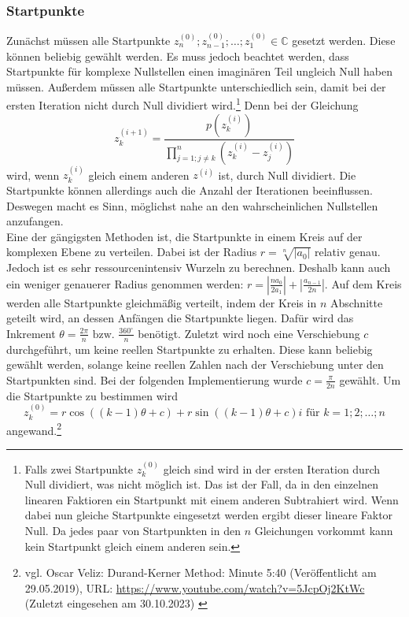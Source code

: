 \documentclass[12pt]{article}
\begin{document}
\subsubsection{Startpunkte}
Zunächst müssen alle Startpunkte $z_n^{(0)};z_{n-1}^{(0)};\dots;z_1^{(0)} \in \mathbb{C}$ gesetzt werden. Diese können beliebig gewählt werden. Es muss jedoch beachtet werden, dass Startpunkte für komplexe Nullstellen einen imaginären Teil ungleich Null haben müssen. Außerdem müssen alle Startpunkte unterschiedlich sein, damit bei der ersten Iteration nicht durch Null dividiert wird.\footnote{
    Falls zwei Startpunkte $z_k^{(0)}$ gleich sind wird in der ersten Iteration durch Null dividiert, was nicht möglich ist. Das ist der Fall, da in den einzelnen linearen Faktioren ein Startpunkt mit einem anderen Subtrahiert wird. Wenn dabei nun gleiche Startpunkte eingesetzt werden ergibt dieser lineare Faktor Null. Da jedes paar von Startpunkten in den $n$ Gleichungen vorkommt kann kein Startpunkt gleich einem anderen sein.
}
Denn bei der Gleichung
\begin{equation*}
    z_k^{(i+1)} = \frac{p(z_{k}^{(i)})}{\prod_{j=1;j\neq k}^{n}(z_{k}^{(i)}-z_j^{(i)})}
\end{equation*}
wird, wenn $z_{k}^{(i)}$ gleich einem anderen $z^{(i)}$ ist, durch Null dividiert.
Die Startpunkte können allerdings auch die Anzahl der Iterationen beeinflussen. Deswegen macht es Sinn, möglichst nahe an den wahrscheinlichen Nullstellen anzufangen.\\
Eine der gängigsten Methoden ist, die Startpunkte in einem Kreis auf der komplexen Ebene zu verteilen. Dabei ist der Radius $r = \sqrt[n]{|a_0|}$ relativ genau. Jedoch ist es sehr ressourcenintensiv Wurzeln zu berechnen. Deshalb kann auch ein weniger genauerer Radius genommen werden: $r = |\frac{na_0}{2a_1}| + |\frac{a_{n-1}}{2n}|$.
Auf dem Kreis werden alle Startpunkte gleichmäßig verteilt, indem der Kreis in $n$ Abschnitte geteilt wird, an dessen Anfängen die Startpunkte liegen. Dafür wird das Inkrement $\theta = \frac{2\pi}{n} \text{ bzw. } \frac{360^\circ}{n}$ benötigt. Zuletzt wird noch eine Verschiebung $c$ durchgeführt, um keine reellen Startpunkte zu erhalten. Diese kann beliebig gewählt werden, solange keine reellen Zahlen nach der Verschiebung unter den Startpunkten sind. Bei der folgenden Implementierung wurde $c = \frac{\pi}{2n}$ gewählt.
Um die Startpunkte zu bestimmen wird 
\[z_{k}^{(0)} = r\cos((k-1)\theta+c)+r\sin((k-1)\theta+c)i \text{ für } k=1;2;\dots;n\]
angewand.\footnote{
    vgl. Oscar Veliz: Durand-Kerner Method: Minute 5:40 (Veröffentlicht am 29.05.2019), URL: \url{https://www.youtube.com/watch?v=5JcpOj2KtWc} (Zuletzt eingesehen am 30.10.2023) \label{ftn:OscarVilez,5:40}
}
\end{document}
